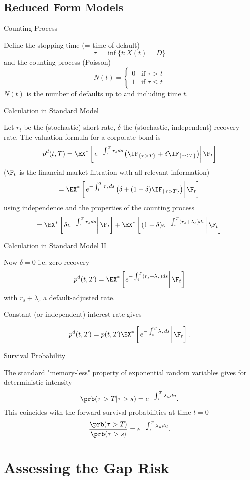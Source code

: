 \subsection{Reduced Form  Models}

{Counting Process}

Define the stopping time (= time of default) $$\tau = \inf \{ t :
X(t) = D \}
$$
and the counting process (Poisson)
$$
N(t) = \begin{cases} 0 \;\;\; \mbox{if $\tau >t$}\\ 1 \;\;\; \mbox{if $\tau \leq t$}\end{cases}
$$
$N(t)$ is the number of defaults up to and including time $t$.

{Calculation in Standard Model}

Let $r_t$ be the (stochastic) short rate, $\delta$ the (stochastic, independent) recovery rate.
The valuation formula for a corporate bond is
$$
p^d (t,T) =  \EX^* \left[ \left. e^{-\int_t^T r_sds} \left(
\IF_{\{\tau >T\}} + \delta \IF_{\{\tau \leq T\}}\right)\right| \F_t\right]
$$
($\F_t$ is the financial market
filtration with all relevant information)
$$
=\EX^* \left[ \left. e^{-\int_t^T r_sds} \left(
\delta+ (1-\delta) \IF_{\{\tau >T\}} \right)\right| \F_t\right]
$$
using independence and the properties of the counting process
$$
=\EX^* \left[ \left.  \delta e^{-\int_t^T r_sds} \right| \F_t\right]
+\EX^* \left[ \left. (1-\delta) e^{-\int_t^T (r_s+ \lambda_s) ds} \right| \F_t\right]
$$

{Calculation in Standard Model II}

Now $\delta=0$ i.e. zero recovery
$$
p^d (t,T) =  \EX^* \left[ \left.e^{-\int_t^T (r_s+ \lambda_s) ds} \right| \F_t\right]
$$
with $r_s+\lambda_s$ a default-adjusted rate.

Constant (or independent) interest rate gives

$$
p^d (t,T) =  p(t,T) \EX^* \left[ \left.e^{-\int_t^T \lambda_s ds} \right| \F_t\right].
$$

{Survival Probability}

The standard "memory-less" property of exponential random variables gives for deterministic intensity
$$
\prb(\tau > T | \tau >s) =   e^{-\int_s^T \lambda_udu}.
$$
This coincides with the forward survival probabilities at time $t=0$
$$
\frac{\prb(\tau > T)}{\prb(\tau>s)}=  e^{-\int_s^T \lambda_udu}.
$$

\section{Assessing the Gap Risk}

